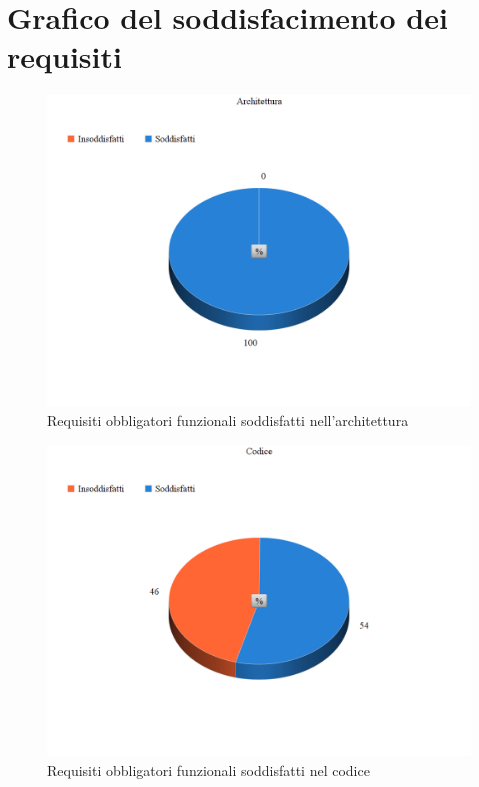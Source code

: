 \documentclass[openany,12pt,a4paper]{report}
\begin{document}
	\section{Grafico del soddisfacimento dei requisiti}
	\begin{figure}[H]
		\includegraphics[scale=0.38]{Requisiti_obbligatori_architettura}
		\centering
		\caption{Requisiti obbligatori funzionali soddisfatti nell'architettura}
	\end{figure}
	\begin{figure}[H]
		\includegraphics[scale=0.38]{Requisiti_obbligatori_codice}
		\centering
		\caption{Requisiti obbligatori funzionali soddisfatti nel codice}
	\end{figure}
	
\end{document}
